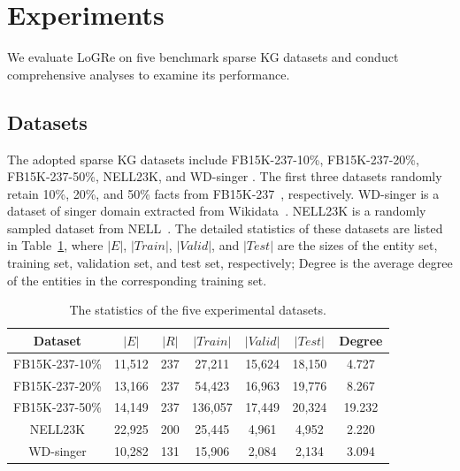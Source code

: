 \documentclass[sigconf]{acmart}
\begin{document}
\section{Experiments}
\label{sec:experiments}
We evaluate LoGRe on five benchmark sparse KG datasets and conduct comprehensive analyses to examine its performance.

\subsection{Datasets}
\label{subsec:datasets}
The adopted sparse KG datasets include FB15K-237-10\%, FB15K-237-20\%, FB15K-237-50\%, NELL23K, and WD-singer \cite{DacKGR}. The first three datasets randomly retain 10\%, 20\%, and 50\% facts from FB15K-237~\cite{FB15K-237}, respectively. WD-singer is a dataset of singer domain extracted from Wikidata~\cite{Wikidata}. NELL23K is a randomly sampled dataset from NELL~\cite{NELL}. The detailed statistics of these datasets are listed in Table~\ref{table:dataset}, where $|E|$, $|Train|$, $|Valid|$, and $|Test|$ are the sizes of the entity set, training set, validation set, and test set, respectively; Degree is the average degree of the entities in the corresponding training set.
\begin{table}[htb]
	\setlength{\tabcolsep}{0.43em}
	\centering
	\small
	\caption{The statistics of the five experimental datasets.}
	\begin{tabular}{c|c|c|c|c|c|c}
		\toprule[1pt]
		Dataset &$|E|$ &$|R|$ &$|Train|$ &$|Valid|$ &$|Test|$ &Degree\\
		\midrule[0.5pt]
		\!FB15K-237-10\% &11,512 &237 &27,211 &15,624 &18,150 &4.727\\
		\!FB15K-237-20\% &13,166 &237 &54,423 &16,963 &19,776 &8.267\\
		\!FB15K-237-50\% &14,149 &237 &136,057 &17,449 &20,324 &19.232\\
		NELL23K &22,925 &200 &25,445 &4,961 &4,952 &2.220\\
		WD-singer &10,282 &131 &15,906 &2,084 &2,134 &3.094\\
		\bottomrule[1pt]
	\end{tabular}
	\label{table:dataset}
\end{table}
\end{document}
